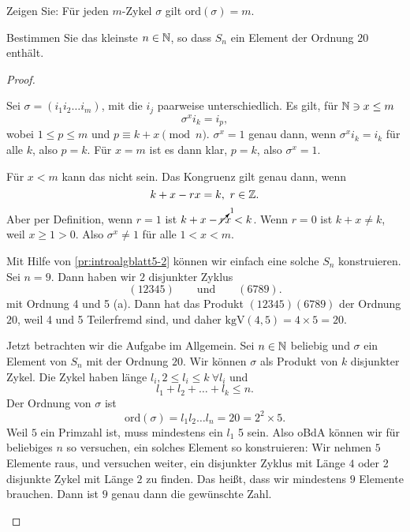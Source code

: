 \begin{Problem}
	\begin{parts}
	\item Zeigen Sie: F\"{u}r jeden $m$-Zykel $\sigma$ gilt $\text{ord}(\sigma)=m$.
	\item Bestimmen Sie das kleinste $n\in \mathbb{N}$, so dass $S_n$ ein Element der Ordnung $20$ enthält.
	\end{parts}
\end{Problem}
\begin{proof}
	\begin{parts}
	\item Sei $\sigma=(i_1i_2\dots i_m)$, mit die $i_j$ paarweise unterschiedlich. Es gilt, f\"{u}r $\mathbb{N}\ni x\le m$
		\[
		\sigma^x i_k=i_p
		,\] 
		wobei $1\le p \le m$ und $p\equiv k+x\pmod{n}$. $\sigma^x=1$ genau dann, wenn $\sigma^x i_k=i_k$ f\"{u}r alle $k$, also $p=k$. F\"{u}r $x=m$ ist es dann klar, $p=k$, also $\sigma^x=1$. 

		F\"{u}r $x < m$ kann das nicht sein. Das Kongruenz gilt genau dann, wenn
		\[
		k+x-rx=k,~r\in \mathbb{Z}
		.\] 
		Aber per Definition, wenn $r=1$ ist $k+x-\cancelto{1}{r}x<k$. Wenn $r=0$ ist $k+x\neq k$, weil $x\ge 1>0$. Also $\sigma^x\neq 1$ f\"{u}r alle $1 < x < m$.
	\item Mit Hilfe von \ref{pr:introalgblatt5-2} können wir einfach eine solche $S_n$ konstruieren. Sei $n=9$. Dann haben wir $2$ disjunkter Zyklus
		\[
			(12345)\qquad\text{und}\qquad(6789)
		.\] 
		mit Ordnung 4 und 5 (a). Dann hat das Produkt $(12345)(6789)$ der Ordnung $20$, weil 4 und 5 Teilerfremd sind, und daher $\text{kgV}(4,5)=4\times 5=20$.

		Jetzt betrachten wir die Aufgabe im Allgemein. Sei $n\in \mathbb{N}$ beliebig und $\sigma$ ein Element von $S_n$ mit der Ordnung $20$. Wir können $\sigma$ als Produkt von $k$ disjunkter Zykel. Die Zykel haben länge $l_i, 2\le l_i \le k~\forall l_i$ und
		\[
		l_1+l_2+\dots+l_k\le n
		.\] 
		Der Ordnung von $\sigma$ ist
		\[
			\text{ord}(\sigma)=l_1l_2\dots l_n=20=2^2\times 5
		.\] 
		Weil $5$ ein Primzahl ist, muss mindestens ein $l_1$ 5 sein. Also oBdA können wir f\"{u}r beliebiges $n$ so versuchen, ein solches Element so konstruieren: Wir nehmen $5$ Elemente raus, und versuchen weiter, ein disjunkter Zyklus mit Länge $4$ oder 2 disjunkte Zykel mit Länge $2$ zu finden. Das heißt, dass wir mindestens $9$ Elemente brauchen. Dann ist $9$ genau dann die gewünschte Zahl.\qedhere
	\end{parts}
\end{proof}

